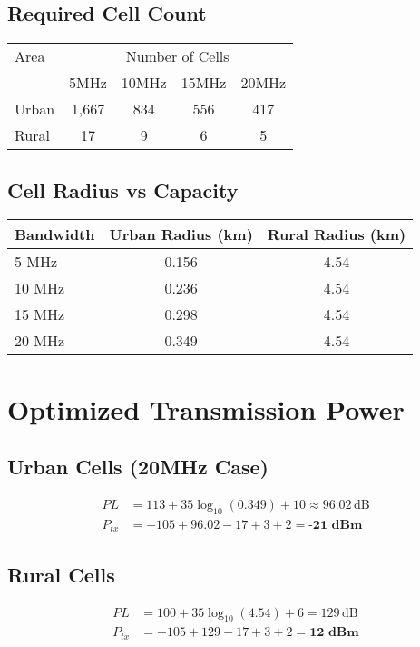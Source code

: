 \documentclass[a4paper,12pt]{article}
\begin{document}
\subsection*{Required Cell Count}
\begin{center}
\begin{tabular}{lcccc}
\toprule
Area & \multicolumn{4}{c}{Number of Cells} \\
 & 5MHz & 10MHz & 15MHz & 20MHz \\
\midrule
Urban & 1,667 & 834 & 556 & 417 \\
Rural & 17 & 9 & 6 & 5 \\
\bottomrule
\end{tabular}
\end{center}

\subsection*{Cell Radius vs Capacity}
\begin{center}
\begin{tabular}{lcc}
\toprule
Bandwidth & Urban Radius (km) & Rural Radius (km) \\
\midrule
5 MHz & 0.156 & 4.54 \\
10 MHz & 0.236 & 4.54 \\
15 MHz & 0.298 & 4.54 \\
20 MHz & 0.349 & 4.54 \\
\bottomrule
\end{tabular}
\end{center}

\section{Optimized Transmission Power}

\subsection*{Urban Cells (20MHz Case)}
\[
\begin{aligned}
PL &= 113 + 35\log_{10}(0.349) + 10 \approx 96.02\,\text{dB} \\
P_{tx} &= -105 + 96.02 - 17 + 3 + 2 = \textbf{-21 dBm}
\end{aligned}
\]

\subsection*{Rural Cells}
\[
\begin{aligned}
PL &= 100 + 35\log_{10}(4.54) + 6 = 129\,\text{dB} \\
P_{tx} &= -105 + 129 - 17 + 3 + 2 = \textbf{12 dBm}
\end{aligned}
\]
\end{document}
